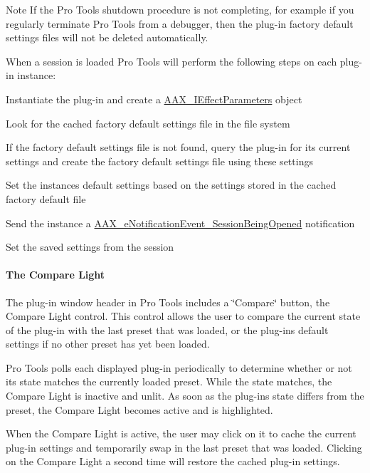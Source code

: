 \begin{DoxyNote}{Note}
If the Pro Tools shutdown procedure is not completing, for example if you regularly terminate Pro Tools from a debugger, then the plug-\/in factory default settings files will not be deleted automatically.
\end{DoxyNote}
When a session is loaded Pro Tools will perform the following steps on each plug-\/in instance\+: 
\begin{DoxyEnumerate}
\item Instantiate the plug-\/in and create a \mbox{\hyperlink{a01825}{A\+A\+X\+\_\+\+I\+Effect\+Parameters}} object  
\item Look for the cached factory default settings file in the file system  
\item If the factory default settings file is not found, query the plug-\/in for its current settings and create the factory default settings file using these settings  
\item Set the instance\textquotesingle{}s default settings based on the settings stored in the cached factory default file  
\item Send the instance a \mbox{\hyperlink{a00491_afab5ea2cfd731fc8f163b6caa685406ea013a21c2c111bac54b962b40f1b4bc1f}{A\+A\+X\+\_\+e\+Notification\+Event\+\_\+\+Session\+Being\+Opened}} notification  
\item Set the saved settings from the session  
\end{DoxyEnumerate}

\hypertarget{a00830_subsubsection__the_compare_light_}{}\paragraph{The Compare Light}\label{a00830_subsubsection__the_compare_light_}
 The plug-\/in window header in Pro Tools includes a \char`\"{}\+Compare\char`\"{} button, the Compare Light control. This control allows the user to compare the current state of the plug-\/in with the last preset that was loaded, or the plug-\/in\textquotesingle{}s default settings if no other preset has yet been loaded.

Pro Tools polls each displayed plug-\/in periodically to determine whether or not its state matches the currently loaded preset. While the state matches, the Compare Light is inactive and unlit. As soon as the plug-\/in\textquotesingle{}s state differs from the preset, the Compare Light becomes active and is highlighted.

When the Compare Light is active, the user may click on it to cache the current plug-\/in settings and temporarily swap in the last preset that was loaded. Clicking on the Compare Light a second time will restore the cached plug-\/in settings.

